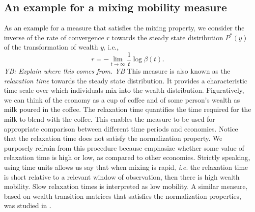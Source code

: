 \documentclass[11pt]{article}
\newcommand{\blue}[1]{{\color{blue} #1}}
\newcommand{\ie}{{\it i.e.}\xspace}
\newcommand{\YB}[1]{\blue{{\it YB: #1 YB}}}
\newcommand{\be}{\begin{equation}}
\newcommand{\ee}{\end{equation}}
\numberwithin{equation}{section}
\begin{document}
\subsection{An example for a mixing mobility measure}
\label{sec:relaxation-time}
As an example for a measure that satisfies the mixing property, we consider the inverse of the rate of convergence $r$ towards the steady state distribution $P^*(y)$ of the transformation of wealth $y$, i.e.,
%
\be
    r = - \lim_{t \to \infty} \frac{1}{t} \log \beta(t).
\ee
%
\YB{Explain where this comes from.}
This measure is also known as the \textit{relaxation time} towards the steady state distribution. It provides a characteristic time scale over which individuals mix into the wealth distribution. Figuratively, we can think of the economy as a cup of coffee and of some person's wealth as milk poured in the coffee. The relaxation time quantifies the time required for the milk to blend with the coffee. This enables the measure to be used for appropriate comparison between different time periods and economies. Notice that the relaxation time does not satisfy the normalization property. We purposely refrain from this procedure because emphasize whether some value of relaxation time is high or low, as compared to other economies. Strictly speaking, using time units allows us say that when mixing is rapid, \ie the relaxation time is short relative to a relevant window of observation, then there is high wealth mobility. Slow relaxation times is interpreted as low mobility. A similar measure, based on wealth transition matrices that satisfies the normalization properties, was studied in \citep{Shorrocks1978}.
\end{document}
